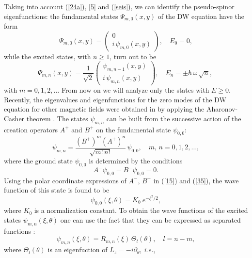 \documentclass[aps,showpacs,showkeys]{revtex4}
\begin{document}
Taking into account (\ref{24a}), \eqref{5} and  (\ref{seis}), we can identify the pseudo-spinor eigenfunctions: the fundamental states $\Psi_{m,0}(x,y)$ of the DW equation have the form
\begin{equation}\label{32}
\Psi_{m,0}(x,y)=\left(\begin{array}{c}
0 \\ i\,\psi_{m,0}(x,y)
\end{array}\right), \quad E_0=0,
\end{equation}
while the excited states, with $n\geq1$, turn out to be
\begin{equation}\label{33}
\Psi_{m,n}(x,y)=\frac{1}{\sqrt{2}}\left(\begin{array}{c}
\psi_{m,n-1}(x,y)\\
i\,\psi_{m,n}(x,y)
\end{array}\right), \quad E_n=\pm \hbar\,\omega\, \sqrt{n}, \ 
\end{equation}
with $m=0,1,2,\dots$ From now on we will analyze only the states with $E\geq 0$. Recently, the eigenvalues and  eigenfunctions for the zero modes of the DW equation for other magnetic fields were obtained in \cite{s18,kns18} by applying the Aharonov-Casher theorem \cite{ac79}.
The states $\psi_{m,n}$ can be built from the successive action of the creation operators $A^+$ and $B^+$ on the fundamental state $\psi_{0,0}$:
\begin{equation}\label{25}
\psi_{m,n}=\frac{(B^+)^m(A^+)^{n}}{\sqrt{m!\,n!}}\, \psi_{0,0}, \quad m,\,n=0,1,2,\dots,
\end{equation}
where the ground state $\psi_{0,0}$ is determined by the conditions
\begin{equation}\label{26}
A^-\psi_{0,0}=B^-\psi_{0,0}=0.
\end{equation}
Using the polar coordinate expressions of $A^{-}$, $B^{-}$ in (\ref{15}) and (\ref{35}), the wave function of this state is found to be
\begin{equation}
\psi_{0,0}(\xi,\theta)=K_0 \ e^{-\xi^2/2},
\end{equation}
where $K_0$ is a normalization constant. To obtain the wave functions of the excited states $\psi_{m,n}(\xi,\theta)$ one can use the fact that they can be expressed as separated functions \cite{dknn17}:
\begin{equation}\label{27}
\psi_{m,n}(\xi,\theta)=  R_{m,n}(\xi)\, \Theta_l(\theta), \quad l=n-m,
\end{equation}
where $\Theta_l(\theta)$ is an eigenfuction of $L_z=-i\partial_{\theta}$, {\it i.e.},
\end{document}
